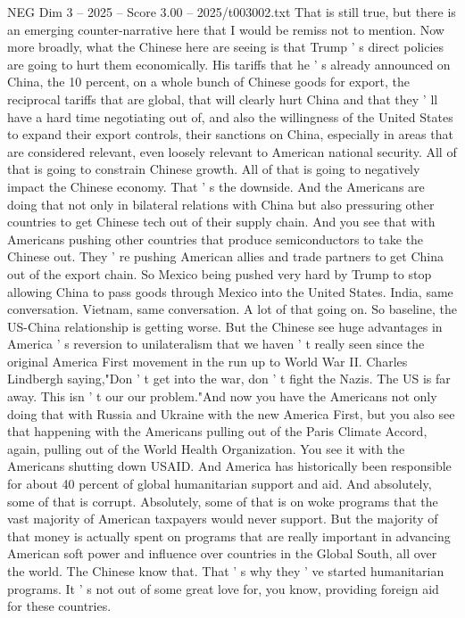 \begin{textsample}{NEG Dim 3 – 2025 – Score 3.00 – 2025/t003002.txt}
That is still true, but there is an emerging counter-narrative here that I would be remiss not to mention.
Now more broadly, what the Chinese here are seeing is that Trump ' s direct policies are going to hurt them economically.
His tariffs that he ' s already announced on China, the 10 percent, on a whole bunch of Chinese goods for export, the reciprocal tariffs that are global, that will clearly hurt China and that they ' ll have a hard time negotiating out of, and also the willingness of the United States to expand their export controls, their sanctions on China, especially in areas that are considered relevant, even loosely relevant to American national security.
All of that is going to constrain Chinese growth.
All of that is going to negatively impact the Chinese economy.
That ' s the downside.
And the Americans are doing that not only in bilateral relations with China but also pressuring other countries to get Chinese tech out of their supply chain.
And you see that with Americans pushing other countries that produce semiconductors to take the Chinese out.
They ' re pushing American allies and trade partners to get China out of the export chain.
So Mexico being pushed very hard by Trump to stop allowing China to pass goods through Mexico into the United States.
India, same conversation.
Vietnam, same conversation.
A lot of that going on.
So baseline, the US-China relationship is getting worse.
But the Chinese see huge advantages in America ' s reversion to unilateralism that we haven ' t really seen since the original America First movement in the run up to World War II.
Charles Lindbergh saying,"Don ' t get into the war, don ' t fight the Nazis.
The US is far away.
This isn ' t our our problem."And now you have the Americans not only doing that with Russia and Ukraine with the new America First, but you also see that happening with the Americans pulling out of the Paris Climate Accord, again, pulling out of the World Health Organization.
You see it with the Americans shutting down USAID.
And America has historically been responsible for about 40 percent of global humanitarian support and aid.
And absolutely, some of that is corrupt.
Absolutely, some of that is on woke programs that the vast majority of American taxpayers would never support.
But the majority of that money is actually spent on programs that are really important in advancing American soft power and influence over countries in the Global South, all over the world.
The Chinese know that.
That ' s why they ' ve started humanitarian programs.
It ' s not out of some great love for, you know, providing foreign aid for these countries.

\end{textsample}
